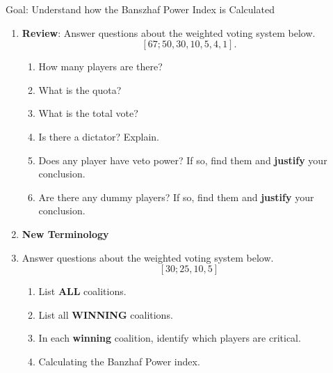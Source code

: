 \documentclass[12pt]{article}
\renewcommand{\emph}[1]{\textsf{\textbf{#1}}}
\begin{document}
Goal: Understand how the Banszhaf Power Index is Calculated 
\begin{enumerate}
\item \textbf{Review}: Answer questions about the weighted voting system below.
$$[67;50,30,10,5,4,1].$$
	\begin{enumerate}
	\item How many players are there? \underline{\hspace{.5in}}\\
	\item What is the quota? \underline{\hspace{.5in}}\\
	\item What is the total vote? \underline{\hspace{.5in}}\\
	\item Is there a dictator? Explain.\\
	\vfill
	\item Does any player have veto power? If so, find them and \emph{justify} your conclusion.\\
	\vfill
	\item Are there any dummy players? If so, find them and \emph{justify} your conclusion.\\
	\vfill
	\end{enumerate}
\item \textbf{New Terminology}\\

\vfill

\vfill

\newpage
\item Answer questions about the weighted voting system below.
$$[30; 25, 10, 5]$$
	\begin{enumerate}
	\item List \emph{ALL} coalitions.
	\vfill
	\item List all \emph{WINNING} coalitions.
	\vfill
	\item In each \emph{winning} coalition, identify which players are critical.
	\vfill
	\item Calculating the Banzhaf Power index.
	\vfill
	
	\vfill
	\end{enumerate}
	

\end{enumerate}
\end{document}
